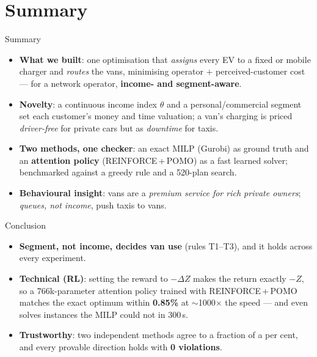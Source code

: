 \documentclass[aspectratio=169,11pt]{beamer}
\begin{document}
\section{Summary}

\begin{frame}{Summary}
  {\footnotesize
  \begin{itemize}
    \item \textbf{What we built}: one optimisation that \emph{assigns} every EV to a fixed or mobile charger and \emph{routes} the vans, minimising operator $+$ perceived-customer cost --- for a network operator, \textbf{income- and segment-aware}.
    \item \textbf{Novelty}: a continuous income index $\theta$ and a personal/commercial segment set each customer's money and time valuation; a van's charging is priced \emph{driver-free} for private cars but as \emph{downtime} for taxis.
    \item \textbf{Two methods, one checker}: an exact MILP (Gurobi) as ground truth and an \textbf{attention policy} (REINFORCE\,+\,POMO) as a fast learned solver; benchmarked against a greedy rule and a 520-plan search.
    \item \textbf{Behavioural insight}: vans are a \emph{premium service for rich private owners}; \emph{queues, not income}, push taxis to vans.
  \end{itemize}}
\end{frame}

\begin{frame}{Conclusion}
  {\footnotesize
  \begin{itemize}
    \item \textbf{Segment, not income, decides van use} (rules T1--T3), and it holds across every experiment.
    \item \textbf{Technical (RL)}: setting the reward to $-\Delta Z$ makes the return exactly $-Z$, so a 766k-parameter attention policy trained with REINFORCE\,+\,POMO matches the exact optimum within \textbf{0.85\%} at $\sim$1000$\times$ the speed --- and even solves instances the MILP could not in 300\,s.
    \item \textbf{Trustworthy}: two independent methods agree to a fraction of a per cent, and every provable direction holds with \textbf{0 violations}.
  \end{itemize}}
\end{frame}
\end{document}
